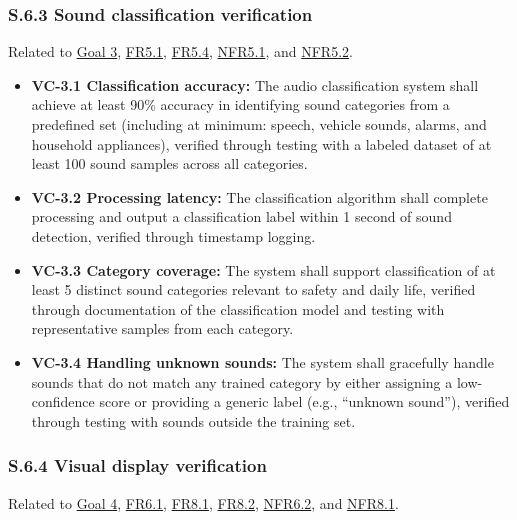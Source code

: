 \documentclass[12pt]{article}
\theoremstyle{definition}
\begin{document}
\subsubsection{S.6.3 Sound classification verification}

Related to \hyperref[goal:audio_identification_analysis]{Goal 3},
\hyperref[FR5_1]{FR5.1}, \hyperref[FR5_4]{FR5.4}, \hyperref[NFR5_1]{NFR5.1}, and
\hyperref[NFR5_2]{NFR5.2}.

\begin{itemize}
\item \textbf{VC-3.1 Classification accuracy:} The audio classification system
shall achieve at least 90\% accuracy in identifying sound categories from a
predefined set (including at minimum: speech, vehicle sounds, alarms, and
household appliances), verified through testing with a labeled dataset of at
least 100 sound samples across all categories.

\item \textbf{VC-3.2 Processing latency:} The classification algorithm shall
complete processing and output a classification label within 1 second of sound
detection, verified through timestamp logging.

\item \textbf{VC-3.3 Category coverage:} The system shall support classification
of at least 5 distinct sound categories relevant to safety and daily life,
verified through documentation of the classification model and testing with
representative samples from each category.

\item \textbf{VC-3.4 Handling unknown sounds:} The system shall gracefully
handle sounds that do not match any trained category by either assigning a
low-confidence score or providing a generic label (e.g., ``unknown sound''),
verified through testing with sounds outside the training set.
\end{itemize}

\subsubsection{S.6.4 Visual display verification}

Related to \hyperref[goal:visual_display]{Goal 4}, \hyperref[FR6_1]{FR6.1},
\hyperref[FR8_1]{FR8.1}, \hyperref[FR8_2]{FR8.2}, \hyperref[NFR6_2]{NFR6.2}, and
\hyperref[NFR8_1]{NFR8.1}.
\end{document}
